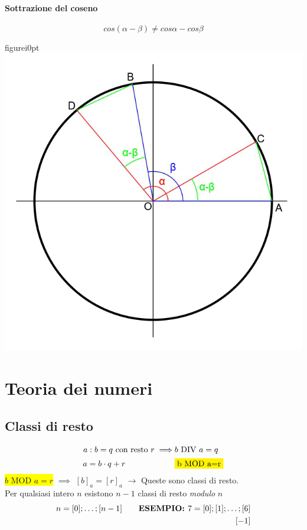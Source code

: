 \documentclass[12pt, a4paper,oneside]{report}
\begin{document}
			\subsubsection{Sottrazione del coseno}
			\[cos(\alpha-\beta)\neq cos\alpha - cos\beta \]
			\begin{wrapfloat}{figure}{i}{0pt}
			\includegraphics{SottCos.jpg}
			\end{wrapfloat}
\chapter{Teoria dei numeri}
	\section{Classi di resto}
	\begin{align*}
	a:b=q \text{ con resto }r\implies & b \text{ DIV }a=q \\
	a=b\cdot q+r \qquad\qquad\qquad & \colorbox{yellow}{b\text{ MOD }a=r}
	\end{align*}
	\colorbox{yellow}{$b\text{ MOD }a=r$} $\implies$ $[b]_a=[r]_a$ $\to$ Queste sono classi di resto.\\
	Per qualsiasi intero $n$ esistono $n-1$ classi di resto \textit{modulo} $n$\\
	\begin{align*}
	n=[0];\dots;[n-1] \qquad \text{\textbf{ESEMPIO: }} 7=[0];[1];\dots;[&6]\\
	[-&1]
	\end{align*}
\end{document}
